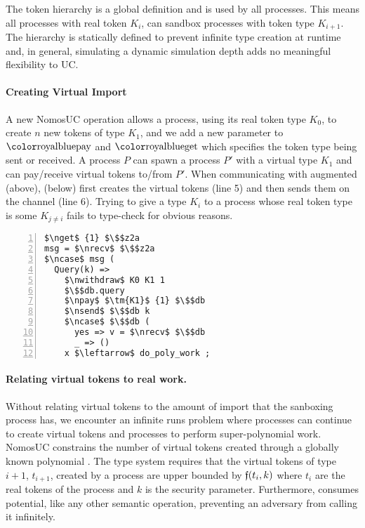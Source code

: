 The token hierarchy is a global definition and is used by all processes. 
This means all processes with real token $K_i$, can sandbox processes with token type $K_{i+1}$.
The hierarchy is statically defined to prevent infinite type creation at runtime and, in general, simulating a dynamic simulation depth adds no meaningful flexibility to UC.

\paragraph{Creating Virtual Import}
A new NomosUC operation  allows a process, using its real token type $K_0$, to create $n$ new tokens of type $K_1$, and we add a new parameter to $\npay$ and $\nget$ which specifies the token type being sent or received. 
A process $P$ can spawn a process $P'$ with a virtual type $K_1$ and can pay/receive virtual tokens to/from $P'$.
When communicating with augmented \Fdb (above), \Sim (below) first creates the virtual tokens (line 5) and then sends them on the channel (line 6).
Trying to give a type $K_i$ to a process whose real token type is some $K_{j \neq i}$ fails to type-check for obvious reasons.
\begin{lstlisting}[basicstyle=\scriptsize\BeraMonottFamily, frame=single, mathescape, numbers=left, xleftmargin=2em, xrightmargin=2em]
$\nget$ {1} $\$$z2a
msg = $\nrecv$ $\$$z2a
$\ncase$ msg (
  Query(k) => 
    $\nwithdraw$ K0 K1 1
    $\$$db.query
    $\npay$ $\tm{K1}$ {1} $\$$db
    $\nsend$ $\$$db k
    $\ncase$ $\$$db (
      yes => v = $\nrecv$ $\$$db 
      _ => ()
    x $\leftarrow$ do_poly_work ;
\end{lstlisting}

\paragraph{Relating virtual tokens to real work.}
Without relating virtual tokens to the amount of import that the sanboxing process has, we encounter an infinite runs problem where processes can continue to create virtual tokens and processes to perform super-polynomial work.
NomosUC constrains the number of virtual tokens created through a globally known polynomial \GlobalF.
The type system requires that the virtual tokens of type $i+1$, $t_{i+1}$, created by a process are upper bounded by $\mathfrak{f}(t_i, k)$ where $t_i$ are the real tokens of the process and $k$ is the security parameter. 
Furthermore, \inline{$\nwithdraw$} consumes potential, like any other semantic operation, preventing an adversary from calling it infinitely.

